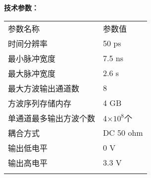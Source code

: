 \vspace{0.4cm}
\noindent\xiaosi\textbf{技术参数：}
\vspace{0.1cm}
\song
\begin{table}[H]
{}
\begin{tabular}{m{6.5cm}|m{6.5cm}}
\rowcolor{myblue}
\color{white}参数名称& \color{white}参数值\\\arrayrulecolor{tabcolor}\midrule[1.2pt]
时间分辨率& 50 ps\\\arrayrulecolor{tabcolor}\midrule[1.2pt]
最小脉冲宽度& 7.5 ns \\\arrayrulecolor{tabcolor}\midrule[1.2pt]
最大脉冲宽度& 2.6 s\\\arrayrulecolor{tabcolor}\midrule[1.2pt]
最大方波输出通道数& 8\\\arrayrulecolor{tabcolor}\midrule[1.2pt]
方波序列存储内存& 4 GB\\\arrayrulecolor{tabcolor}\midrule[1.2pt]
单通道最多输出方波个数& 4×$10^{8}$个\\\midrule[1.2pt]
耦合方式& DC 50 ohm\\\arrayrulecolor{tabcolor}\midrule[1.2pt]
输出低电平& 0 V\\\arrayrulecolor{tabcolor}\midrule[1.2pt]
输出高电平& 3.3 V\\\arrayrulecolor{tabcolor}\midrule[1.2pt]
\end{tabular}
\end{table}



